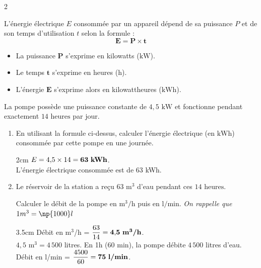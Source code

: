 \documentclass[a4paper]{book}
\begin{document}
{\begin{exerciceNote}{2}
        \begin{center}
        \begin{minipage}{0.8\textwidth}
            \begin{tcolorbox}[colback=gray!5,colframe=gray!40,arc=1mm,title=\small Rappel de cours,fonttitle=\bfseries\small,coltitle=black,colbacktitle=gray!20,size=small]
            L'énergie électrique $E$ consommée par un appareil dépend de sa puissance $P$ et de son temps d'utilisation $t$ selon la formule :
            $$\mathbf{E = P \times t}$$
            \begin{itemize}
                \item[$\bullet$] La puissance $\mathbf{P}$ s'exprime en kilowatts ($\text{kW}$).
                \item[$\bullet$] Le temps $\mathbf{t}$ s'exprime en heures ($\text{h}$).
                \item[$\bullet$] L'énergie $\mathbf{E}$ s'exprime alors en kilowattheures ($\text{kWh}$).
            \end{itemize}
            \end{tcolorbox}
        \end{minipage}
        \end{center}
        \medskip
        
        La pompe possède une puissance constante de $4,5\text{ kW}$ et fonctionne pendant exactement $14\text{ heures}$ par jour.
        \begin{enumerate}
            \item En utilisant la formule ci-dessus, calculer l'énergie électrique (en $\text{kWh}$) consommée par cette pompe en une journée.
            
            \begin{ZoneReponse}{2cm}
            \color{blue}
            $E = 4{,}5 \times 14 = \mathbf{63 \text{ \textbf{kWh}}}$. \\
            L'énergie électrique consommée est de 63 kWh.
            \end{ZoneReponse}
            
            \item Le réservoir de la station a reçu $63\text{ m}^3$ d'eau pendant ces $14\text{ heures}$.
            
            Calculer le débit de la pompe en $\text{m}^3/\text{h}$ puis en $\text{l}/\text{min}$. \textit{On rappelle que $1m^3=\np{1000}l$}
            
            \begin{ZoneReponse}{3.5cm}
            \color{blue}
            Débit en m$^3$/h = $\dfrac{63}{14} = \mathbf{4{,}5 \text{ \textbf{m}}^3\text{\textbf{/h}}}$.\\[0.2cm]
            $4{,}5 \text{ m}^3 = 4\,500$ litres. En 1h (60 min), la pompe débite $4\,500$ litres d'eau.\\
            Débit en l/min = $\dfrac{4500}{60} = \mathbf{75 \text{ \textbf{l/min}}}$.
            \end{ZoneReponse}
        \end{enumerate}
    \end{exerciceNote}

}
\end{document}
